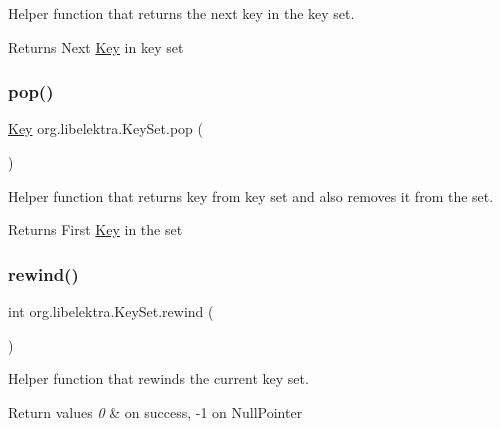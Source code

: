 Helper function that returns the next key in the key set. 

\begin{DoxyReturn}{Returns}
Next \mbox{\hyperlink{classorg_1_1libelektra_1_1Key}{Key}} in key set 
\end{DoxyReturn}
\mbox{\label{classorg_1_1libelektra_1_1KeySet_a6fcb652d72c64772bae40ec801d93ad9}} 
\subsubsection{\texorpdfstring{pop()}{pop()}}
{\footnotesize\ttfamily \mbox{\hyperlink{classorg_1_1libelektra_1_1Key}{Key}} org.\+libelektra.\+Key\+Set.\+pop (\begin{DoxyParamCaption}{ }\end{DoxyParamCaption})\hspace{0.3cm}{\ttfamily [inline]}}



Helper function that returns key from key set and also removes it from the set. 

\begin{DoxyReturn}{Returns}
First \mbox{\hyperlink{classorg_1_1libelektra_1_1Key}{Key}} in the set 
\end{DoxyReturn}
\mbox{\label{classorg_1_1libelektra_1_1KeySet_a20533a5e97b16b76b977b95be179d58c}} 
\subsubsection{\texorpdfstring{rewind()}{rewind()}}
{\footnotesize\ttfamily int org.\+libelektra.\+Key\+Set.\+rewind (\begin{DoxyParamCaption}{ }\end{DoxyParamCaption})\hspace{0.3cm}{\ttfamily [inline]}}



Helper function that rewinds the current key set. 


\begin{DoxyRetVals}{Return values}
{\em 0} & on success, -\/1 on Null\+Pointer \\
\hline
\end{DoxyRetVals}
\mbox{\label{classorg_1_1libelektra_1_1KeySet_adb3caad35c8dfcd1934d7cd32ff0ca4a}} 
